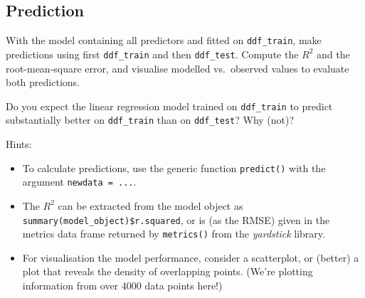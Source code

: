 \documentclass[
]{book}
\providecommand{\tightlist}{%
  \setlength{\itemsep}{0pt}\setlength{\parskip}{0pt}}
\begin{document}
\hypertarget{prediction}{%
\subsection{Prediction}\label{prediction}}

With the model containing all predictors and fitted on \texttt{ddf\_train}, make predictions using first \texttt{ddf\_train} and then \texttt{ddf\_test}. Compute the \(R^2\) and the root-mean-square error, and visualise modelled vs.~observed values to evaluate both predictions.

Do you expect the linear regression model trained on \texttt{ddf\_train} to predict substantially better on \texttt{ddf\_train} than on \texttt{ddf\_test}? Why (not)?

Hints:

\begin{itemize}
\tightlist
\item
  To calculate predictions, use the generic function \texttt{predict()} with the argument \texttt{newdata\ =\ ...}.
\item
  The \(R^2\) can be extracted from the model object as \texttt{summary(model\_object)\$r.squared}, or is (as the RMSE) given in the metrics data frame returned by \texttt{metrics()} from the \emph{yardstick} library.
\item
  For visualisation the model performance, consider a scatterplot, or (better) a plot that reveals the density of overlapping points. (We're plotting information from over 4000 data points here!)
\end{itemize}
\end{document}
